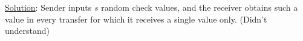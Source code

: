 \underline{Solution}: Sender inputs $s$ random check values, and the receiver obtains such a value in every transfer for which it receives a single value only. (Didn't understand)
%
%
